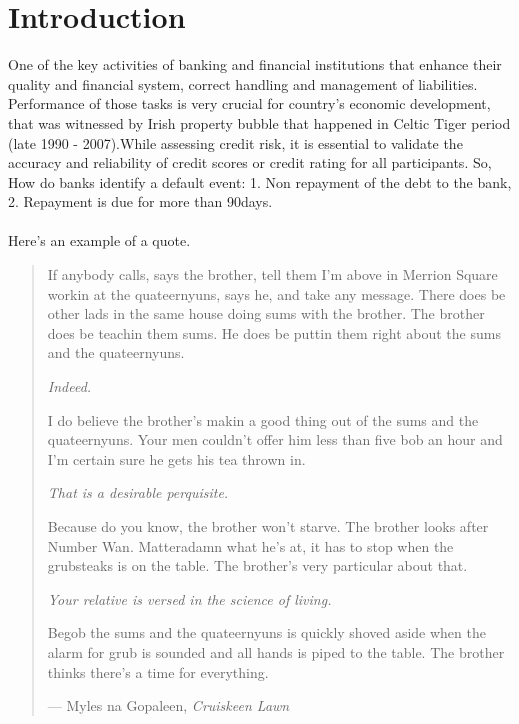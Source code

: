 %
%
%
%

\chapter{Introduction}\label{C.intro}
One of the key activities of banking and financial institutions that enhance their quality and financial system, correct handling and management of liabilities. Performance of those tasks is very crucial for country's economic development, that was witnessed by Irish property bubble that happened in Celtic Tiger period (late 1990 - 2007).While assessing credit risk, it is essential to validate the accuracy and reliability of credit scores or credit rating for all participants. So, How do banks identify a default event: 1. Non repayment of the debt to the bank, 2. Repayment is due for more than 90days.\\\\



Here's an example of a quote.

\begin{quote}
If anybody calls, says the brother, tell them I'm above in Merrion Square workin at the
quateernyuns, says he, and take any message.  There does be other lads in the same house
doing sums with the brother.  The brother does be teachin them sums.  He does be puttin
them right about the sums and the quateernyuns.

\textit{Indeed.}

I do believe the brother's makin a good thing out of the sums and the quateernyuns.  Your
men couldn't offer him less than five bob an hour and I'm certain sure he gets his tea
thrown in.

\textit{That is a desirable perquisite.}

Because do you know, the brother won't starve.  The brother looks after Number Wan.
Matteradamn what he's at, it has to stop when the grubsteaks is on the table.  The brother's
very particular about that.

\textit{Your relative is versed in the science of living.}

Begob the sums and the quateernyuns is quickly shoved aside when the alarm for grub is sounded
and all hands is piped to the table.  The brother thinks there's a time for everything.

\hspace{2cm}--- Myles na Gopaleen, \emph{Cruiskeen Lawn}
\end{quote}


